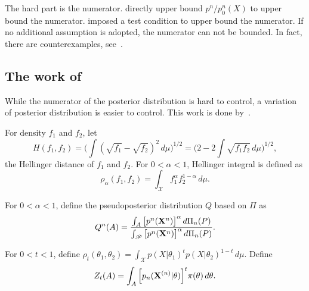 \documentclass[11pt, letterpaper]{article}
\theoremstyle{plain}
\theoremstyle{definition}
\theoremstyle{remark}
\begin{document}
The hard part is the numerator.
\cite{Shen2001Rates} directly upper bound $p^n/p_0^n (X)$ to upper bound the numerator.
\cite{Ghosal2000Asymptotic} imposed a test condition to upper bound the numerator.
If no additional assumption is adopted, the numerator can not be bounded.
In fact, there are counterexamples, see~\cite{diaconis1986consistency}.
\subsection{The work of~\cite{kar10563}}
While the numerator of the posterior distribution is hard to control, a variation of posterior distribution is easier to control.
This work is done by~\cite{kar10563}.

For density $f_1$ and $f_2$, let
$$H(f_1,f_2)=\Big(\int(\sqrt{f_1}-\sqrt{f_2})^2 \, d \mu\Big)^{1/2}=\Big(2-2\int \sqrt{f_1 f_2}\, d \mu \Big)^{1/2},$$
the Hellinger distance of $f_1$ and $f_2$.
For $0<\alpha<1$, Hellinger integral is defined as
$$
\rho_{\alpha}(f_1,f_2)=\int_{\mathcal{X}} f_1^{\alpha} f_2^{1-\alpha} \, d \mu.
$$

For $0<\alpha<1$, define the pseudoposterior distribution $Q$ based on $\Pi$ as
$$
Q^n (A)=\frac{\int_{A} \big[p^n(\mathbf{X}^n)\big]^{\alpha}\, d\Pi_n(P)}{\int_{\mathscr{P}} \big[p^n(\mathbf{X}^n)\big]^{\alpha}\, d\Pi_n(P)}.
$$


For $0<t<1$, define
$
\rho_{t}(\theta_1,\theta_2)=\int_{\mathcal{X}} p(X|\theta_1)^{t} p(X|\theta_2)^{1-t} \, d \mu
$.
Define
$$
Z_t (A)=\int_{A} \Big[ {p_n(\mathbf{X}^{(n)}|\theta)} \Big]^{t} \pi(\theta) \, d \theta.
$$
\end{document}
